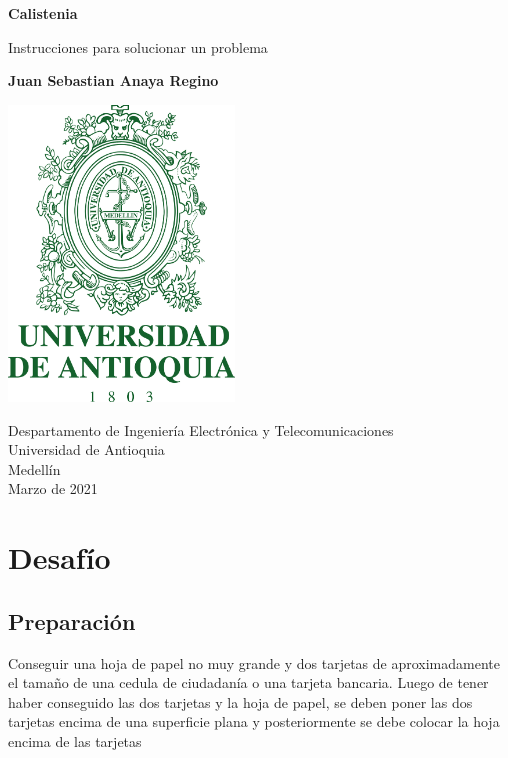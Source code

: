 \documentclass{article}
\begin{document}
\begin{titlepage}
    \begin{center}
        \vspace*{1cm}
            
        \Huge
        \textbf{Calistenia}
            
        \vspace{0.5cm}
        \LARGE
        Instrucciones para solucionar un problema
            
        \vspace{1.5cm}
            
        \textbf{Juan Sebastian Anaya Regino}
        
        \vspace{0.9cm}
        \centering
        \includegraphics[width=6cm]{logo.png}
            
        \vfill
            
        \vspace{0.8cm}
            
        \Large
        Despartamento de Ingeniería Electrónica y Telecomunicaciones\\
        Universidad de Antioquia\\
        Medellín\\
        Marzo de 2021
            
    \end{center}
\end{titlepage}

\tableofcontents
\newpage

\section{Desafío}
    \subsection{Preparación}
    Conseguir una hoja de papel no muy grande y dos tarjetas de aproximadamente el tamaño de una cedula de ciudadanía o una tarjeta bancaria.
    Luego de tener haber conseguido las dos tarjetas y la hoja de papel, se deben poner las dos tarjetas encima de una superficie plana y posteriormente se debe colocar la hoja encima de las tarjetas
    
\end{document}
